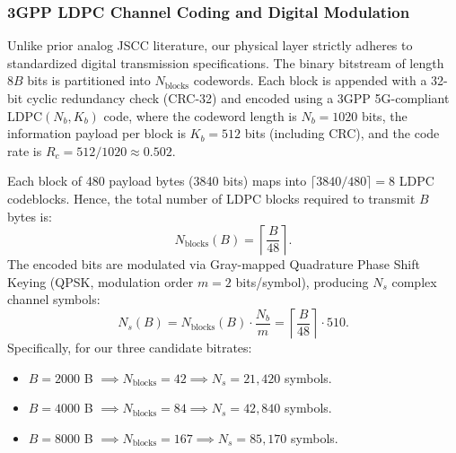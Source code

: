 \subsubsection{3GPP LDPC Channel Coding and Digital Modulation}
Unlike prior analog JSCC literature, our physical layer strictly adheres to standardized digital transmission specifications. The binary bitstream of length $8B$ bits is partitioned into $N_{\mathrm{blocks}}$ codewords. Each block is appended with a 32-bit cyclic redundancy check (CRC-32) and encoded using a 3GPP 5G-compliant $\text{LDPC}(N_b, K_b)$ code, where the codeword length is $N_b = 1020$ bits, the information payload per block is $K_b = 512$ bits (including CRC), and the code rate is $R_c = 512/1020 \approx 0.502$.

Each block of 480 payload bytes (3840 bits) maps into $\lceil 3840 / 480 \rceil = 8$ LDPC codeblocks. Hence, the total number of LDPC blocks required to transmit $B$ bytes is:
\begin{equation}
N_{\mathrm{blocks}}(B) = \left\lceil \frac{B}{48} \right\rceil.
\end{equation}
The encoded bits are modulated via Gray-mapped Quadrature Phase Shift Keying (QPSK, modulation order $m=2$ bits/symbol), producing $N_s$ complex channel symbols:
\begin{equation}
N_s(B) = N_{\mathrm{blocks}}(B) \cdot \frac{N_b}{m} = \left\lceil \frac{B}{48} \right\rceil \cdot 510.
\end{equation}
Specifically, for our three candidate bitrates:
\begin{itemize}
    \item $B = 2000$ B $\implies N_{\mathrm{blocks}} = 42 \implies N_s = 21{,}420$ symbols.
    \item $B = 4000$ B $\implies N_{\mathrm{blocks}} = 84 \implies N_s = 42{,}840$ symbols.
    \item $B = 8000$ B $\implies N_{\mathrm{blocks}} = 167 \implies N_s = 85{,}170$ symbols.
\end{itemize}

